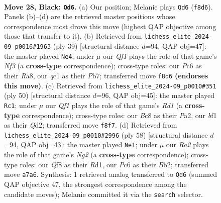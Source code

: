 \documentclass[11pt]{article}
\begin{document}
\begin{figure}[p]\centering
\begin{subfigure}{0.46\textwidth}\centering
\resizebox{\linewidth}{!}{%
\newchessgame
\chessboard[
  setfen={1nb2qr1/rp4k1/2p1p3/p2p1p1p/Pn1P1P1N/2N3P1/1PP3KP/2QR1B1R b - - 10 28},
  showmover=false,
  pgfstyle=straightmove, color=movearrow, markmove={f8-d6}
]}
\caption{}
\end{subfigure}\hfill
\begin{subfigure}{0.46\textwidth}\centering
\resizebox{\linewidth}{!}{%
\newchessgame
\chessboard[
  setfen={r3r1k1/1pq3p1/p1nbpn1p/3p1p2/3P4/2P1BN1P/PP3PP1/R2QRBK1 b - - 3 20},
  showmover=false,
  pgfstyle=straightmove, color=movearrow, markmove={f6-e4}
]}
\caption{}
\end{subfigure}
\\[4pt]
\begin{subfigure}{0.46\textwidth}\centering
\resizebox{\linewidth}{!}{%
\newchessgame
\chessboard[
  setfen={1kr3r1/pp1q4/2n1n3/3p1p1p/3Pp1pP/2P1B1P1/PPNQ1P2/1K1R3R w - - 4 26},
  showmover=false,
  pgfstyle=straightmove, color=movearrow, markmove={d1-c1}
]}
\caption{}
\end{subfigure}\hfill
\begin{subfigure}{0.46\textwidth}\centering
\resizebox{\linewidth}{!}{%
\newchessgame
\chessboard[
  setfen={3r4/p2r2bk/1p1nq1pp/1Pp1pp2/7P/P1NPPnP1/1BQ1RPN1/3R3K w - - 3 30},
  showmover=false,
  pgfstyle=straightmove, color=movearrow, markmove={g2-e1}
]}
\caption{}
\end{subfigure}
\caption{\textbf{Move 28, Black: \texttt{Qd6}.} (a) Our position; Melanie plays \texttt{Qd6} (\texttt{f8d6}). Panels (b)--(d) are the retrieved master positions whose correspondence most drove this move (highest QAP objective among those that transfer to it). (b) Retrieved from \texttt{lichess\_elite\_2024-09\_p0016\#1963} (ply 39) [structural distance $d$=94, QAP obj=47]: the master played \texttt{Ne4}; under $\mu$ our \emph{Qf1} plays the role of that game's \emph{Nf3} (a \textbf{cross-type} correspondence); cross-type roles: our \emph{P}c6 as their \emph{R}a8, our \emph{q}c1 as their \emph{P}b7; transferred move \texttt{f8d6} \textbf{(endorses this move)}. (c) Retrieved from \texttt{lichess\_elite\_2024-09\_p0010\#351} (ply 50) [structural distance $d$=96, QAP obj=45]: the master played \texttt{Rc1}; under $\mu$ our \emph{Qf1} plays the role of that game's \emph{Rd1} (a \textbf{cross-type} correspondence); cross-type roles: our \emph{B}c8 as their \emph{P}a2, our \emph{b}f1 as their \emph{Q}d2; transferred move \texttt{f8f7}. (d) Retrieved from \texttt{lichess\_elite\_2024-09\_p0010\#2996} (ply 58) [structural distance $d$=94, QAP obj=43]: the master played \texttt{Ne1}; under $\mu$ our \emph{Ra2} plays the role of that game's \emph{Ng2} (a \textbf{cross-type} correspondence); cross-type roles: our \emph{Q}f8 as their \emph{R}d1, our \emph{P}c6 as their \emph{B}b2; transferred move \texttt{a7a6}. Synthesis: 1 retrieved analog transferred to \texttt{Qd6} (summed QAP objective 47, the strongest correspondence among the candidate moves); Melanie committed it via the \texttt{search} selector.}
\label{fig:thought-m55}
\end{figure}
\end{document}

